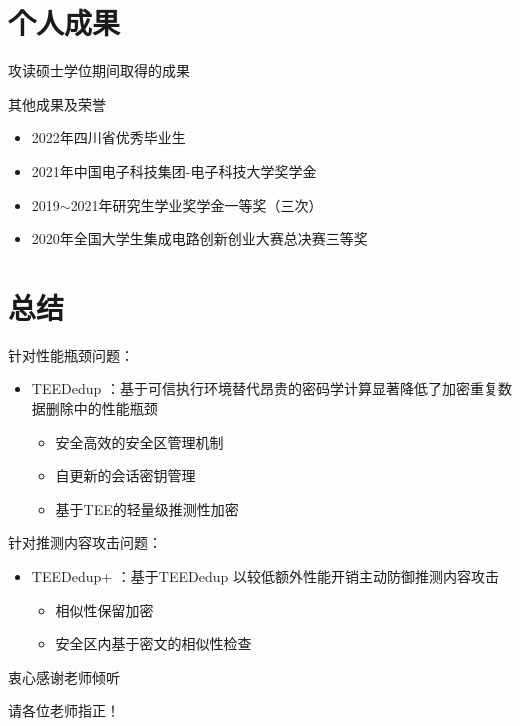 \documentclass{beamer}
\newcommand{\sysnameS}{TEEDedup }
\newcommand{\prototype}{TEEDedup+ }
\begin{document}
\section{个人成果}

\begin{frame}[allowframebreaks]{攻读硕士学位期间取得的成果}
    \newcommand{\bstlabelmark}{lo}
    \nocite{*}
    
    
    \begin{textbox}{其他成果及荣誉}
        \begin{itemize}
            \item 2022年四川省优秀毕业生
            \item 2021年中国电子科技集团-电子科技大学奖学金
            \item 2019$\sim$2021年研究生学业奖学金一等奖（三次）
            \item 2020年全国大学生集成电路创新创业大赛总决赛三等奖
        \end{itemize}
    \end{textbox}
\end{frame}

\section{总结}

\begin{frame}{}
    \begin{textbox}{针对性能瓶颈问题：}
        \begin{itemize}
            \item \sysnameS ：基于可信执行环境替代昂贵的密码学计算显著降低了加密重复数据删除中的性能瓶颈
            \begin{itemize}
                \item 安全高效的安全区管理机制
                \item 自更新的会话密钥管理
                \item 基于TEE的轻量级推测性加密
            \end{itemize}
        \end{itemize}
    \end{textbox}
    \begin{textbox}{针对推测内容攻击问题：}
        \begin{itemize}
            \item \prototype ：基于\sysnameS 以较低额外性能开销主动防御推测内容攻击
            \begin{itemize}
                \item 相似性保留加密
                \item 安全区内基于密文的相似性检查
            \end{itemize}
        \end{itemize}
    \end{textbox}
\end{frame}

\begin{frame}
    \begin{center}
        {\Huge 衷心感谢老师倾听}

        {\Huge 请各位老师指正！}
    \end{center}
\end{frame}
\end{document}
